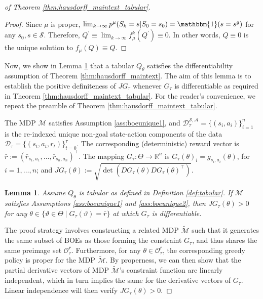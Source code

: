 \documentclass{amsart}
\newtheorem{lemma}{Lemma}
\begin{document}
\begin{proof}[of Theorem \ref{thm:hausdorff_maintext_tabular}]
\begin{proof}
Since $\mu$ is proper, $\lim_{k \rightarrow \infty }p^\mu(S_k=s|S_0=s_0) = \mathbbm{1}(s =s^g)$ for any $s_0,s \in \mathcal{S}$. Therefore, $Q^\prime \equiv \lim_{k\rightarrow \infty} f^k_\mu(Q^\prime)\equiv0$. In other words, $Q \equiv 0$ is the unique solution to $f_\mu(Q)\equiv Q$.
\end{proof}

Now, we show in Lemma \ref{lem:cor:hausdorff} that a tabular $Q_\theta$ satisfies the differentiability assumption of Theorem \ref{thm:hausdorff_maintext}. The aim of this lemma is to establish the positive definiteness of $JG_\tau$ whenever $G_\tau$ is differentiable as required in Theorem \ref{thm:hausdorff_maintext_tabular}. For the reader's convenience, we repeat the preamble of Theorem \ref{thm:hausdorff_maintext_tabular}.

The MDP $\mathcal{M}$ satisfies Assumption
\ref{ass:boeunique1}, and $\mathcal{D}_\tau^{\mathcal{S},\mathcal{A}}=\{(s_i,a_i)\}_{i=1}^n$ is the re-indexed unique non-goal state-action components of the data $\mathcal{D}_\tau=\{(s_t,a_t,r_t)\}_{t=0}^\tau$. The corresponding (deterministic) reward vector is $\bar{r}:=(\bar{r}_{s_1,a_1},\dots,\bar{r}_{s_n,a_n})^\top$. The mapping $G_\tau:\Theta\rightarrow \mathbb{R}^n$ is   $G_\tau(\theta)_i=g_{s_i,a_i}(\theta)$, for $i=1,\ldots,n$; and $JG_\tau(\theta):= \sqrt{\det{(DG_\tau(\theta) DG_\tau(\theta)^\top)}}.$


\begin{lemma}\label{lem:cor:hausdorff} Assume $Q_\theta$ is tabular as defined in Definition \ref{def:tabular}. If $\mathcal{M}$  satisfies Assumptions \ref{ass:boeunique1} and \ref{ass:boeunique2}, then $JG_\tau(\theta) > 0$ for any $\theta \in \{\vartheta \in \Theta \mid G_\tau(\vartheta)=\bar{r}\}$ at which $G_\tau$ is differentiable.
\end{lemma}

The proof strategy involves constructing a related MDP $\widetilde{\mathcal{M}}$ such that it generates the same subset of BOEs as those forming the constraint $G_\tau$, and thus shares the same preimage set $\mathcal{O}_\tau^{\bar{r}}$. Furthermore, for any $\theta \in \mathcal{O}_\tau^{\bar{r}}$, the corresponding greedy policy is proper for the MDP $\widetilde{\mathcal{M}}$.
By properness, we can then show that the partial derivative vectors of MDP $\widetilde{\mathcal{M}}$'s constraint function are linearly independent, which in turn implies the same for the derivative vectors of $G_\tau$. Linear independence will then verify $JG_\tau(\theta) > 0$.


\end{proof}
\end{document}
